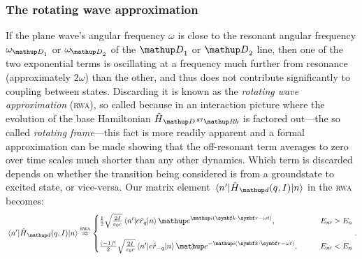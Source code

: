 \subsubsection{The rotating wave approximation}
If the plane wave's angular frequency $\omega$ is close to the resonant angular frequency $\omega_{\up{D}_1}$ or $\omega_{\up{D}_2}$ of the $\up{D}_1$ or $\up{D}_2$ line, then one of the two exponential terms is oscillating at a frequency much further from resonance (approximately $2\omega$) than the other, and thus does not contribute significantly to coupling between states. Discarding it is known as the \emph{rotating wave approximation} (\textsc{rwa}), so called because in an interaction picture where the evolution of the base Hamiltonian $\hat H_{\up{D}\,^{87}\up{Rb}}$ is factored out---the so called \emph{rotating frame}---this fact is more readily apparent and a formal approximation can be made showing that the off-resonant term averages to zero over time scales much shorter than any other dynamics. Which term is discarded depends on whether the transition being considered is from a groundstate to excited state, or vice-versa. Our matrix element $\matrixel{n^\prime}{\hat H_\up{d}(q,I)}{n}$ in the \textsc{rwa} becomes:
\begin{align}\label{eq:rwa_no_rabifreq}
\matrixel{n^\prime}{\hat H_\up{d}(q,I)}{n} \overset{\textsc{rwa}}\approx
\begin{cases}
\frac12\sqrt{\frac{2I}{\varepsilon_0 c}}
\matrixel{n^\prime}
  {e\hat r_q}
  {n}\ee^{\ii(\vec k \cdot \vec r - \omega t)},\qquad &E_{n\prime} > E_n\\
\\
\frac{(-1)^q}2\sqrt{\frac{2I}{\varepsilon_0 c}}
\matrixel{n^\prime}
  {e\hat r_{-q}}
  {n} \ee^{-\ii(\vec k \cdot \vec r - \omega t)},\qquad &E_{n\prime} < E_n
\end{cases}.
\end{align}

